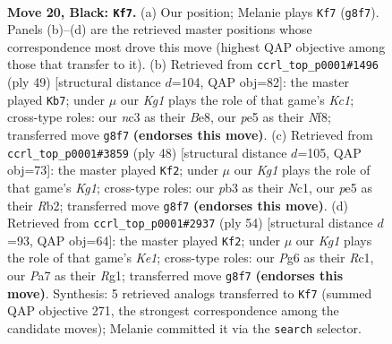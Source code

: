 \documentclass[11pt]{article}
\begin{document}
\begin{figure}[p]
\label{fig:thought-m37}
\end{figure}

\clearpage

\begin{figure}[p]\centering
\begin{subfigure}{0.46\textwidth}\centering
\resizebox{\linewidth}{!}{%
\newchessgame
\chessboard[
  setfen={rn4k1/pp1b4/1p2p1p1/1P1pP3/3P1rpR/1PN5/8/3QKBN1 b - - 0 20},
  showmover=false,
  pgfstyle=straightmove, color=movearrow, markmove={g8-f7}
]}
\caption{}
\end{subfigure}\hfill
\begin{subfigure}{0.46\textwidth}\centering
\resizebox{\linewidth}{!}{%
\newchessgame
\chessboard[
  setfen={2k1bn1r/2p2pp1/1p6/r2NPPNp/p1P3P1/R5KP/2P5/5R2 b - - 0 25},
  showmover=false,
  pgfstyle=straightmove, color=movearrow, markmove={c8-b7}
]}
\caption{}
\end{subfigure}
\\[4pt]
\begin{subfigure}{0.46\textwidth}\centering
\resizebox{\linewidth}{!}{%
\newchessgame
\chessboard[
  setfen={2r3k1/5p1p/n2b2p1/B2p1p2/1p1P4/1P2PP2/1RNn2PP/2N3K1 w - - 1 25},
  showmover=false,
  pgfstyle=straightmove, color=movearrow, markmove={g1-f2}
]}
\caption{}
\end{subfigure}\hfill
\begin{subfigure}{0.46\textwidth}\centering
\resizebox{\linewidth}{!}{%
\newchessgame
\chessboard[
  setfen={4bk2/p5pp/2p2n1q/3pp3/3P3P/2P1NPP1/PP2B3/2R1K1R1 w - - 4 28},
  showmover=false,
  pgfstyle=straightmove, color=movearrow, markmove={e1-f2}
]}
\caption{}
\end{subfigure}
\caption{\textbf{Move 20, Black: \texttt{Kf7}.} (a) Our position; Melanie plays \texttt{Kf7} (\texttt{g8f7}). Panels (b)--(d) are the retrieved master positions whose correspondence most drove this move (highest QAP objective among those that transfer to it). (b) Retrieved from \texttt{ccrl\_top\_p0001\#1496} (ply 49) [structural distance $d$=104, QAP obj=82]: the master played \texttt{Kb7}; under $\mu$ our \emph{Kg1} plays the role of that game's \emph{Kc1}; cross-type roles: our \emph{n}c3 as their \emph{B}e8, our \emph{p}e5 as their \emph{N}f8; transferred move \texttt{g8f7} \textbf{(endorses this move)}. (c) Retrieved from \texttt{ccrl\_top\_p0001\#3859} (ply 48) [structural distance $d$=105, QAP obj=73]: the master played \texttt{Kf2}; under $\mu$ our \emph{Kg1} plays the role of that game's \emph{Kg1}; cross-type roles: our \emph{p}b3 as their \emph{N}c1, our \emph{p}e5 as their \emph{R}b2; transferred move \texttt{g8f7} \textbf{(endorses this move)}. (d) Retrieved from \texttt{ccrl\_top\_p0001\#2937} (ply 54) [structural distance $d$=93, QAP obj=64]: the master played \texttt{Kf2}; under $\mu$ our \emph{Kg1} plays the role of that game's \emph{Ke1}; cross-type roles: our \emph{P}g6 as their \emph{R}c1, our \emph{P}a7 as their \emph{R}g1; transferred move \texttt{g8f7} \textbf{(endorses this move)}. Synthesis: 5 retrieved analogs transferred to \texttt{Kf7} (summed QAP objective 271, the strongest correspondence among the candidate moves); Melanie committed it via the \texttt{search} selector.}
\label{fig:thought-m39}
\end{figure}
\end{document}
